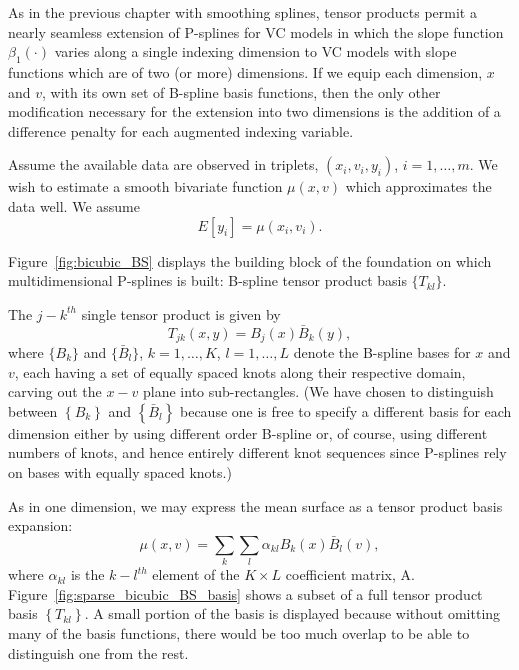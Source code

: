 \documentclass[12pt]{article}
\newcommand*\needsparaphrased{\color{red}}
\theoremstyle{definition}
\begin{document}
As in the previous chapter with smoothing splines, tensor products permit a nearly seamless extension of P-splines for VC models in which the slope function $\beta_1\left(\cdot\right)$ varies along a single indexing dimension to VC models with slope functions which are of two (or more) dimensions. If we equip each dimension, $x$ and $v$, with its own set of B-spline basis functions, then the only other modification necessary for the extension into two dimensions is the addition of a difference penalty for each augmented indexing variable.

Assume the available data are observed in triplets, $\left(x_i,v_i,y_i\right)$, $i=1,\dots,m$. We wish to estimate a smooth bivariate function $\mu\left(x,v\right)$ which approximates the data well. We assume
\begin{equation} \label{eq:2D_intercept_only_model}
E\left[ y_i \right] = \mu\left(x_i,v_i\right).
\end{equation}

Figure~\ref{fig:bicubic_BS} displays the building block of the foundation on which multidimensional P-splines is built: B-spline tensor product basis $\big\{ T_{kl}\big\}$.

The $j-k^{th}$ single tensor product is given by
\[
T_{jk}\left(x,y\right) = B_j\left(x\right)\bar{B}_k\left(y\right),
\]
where 
$\big\{ B_{k}\big\}$ and $\big\{ \bar{B}_{l}\big\}$, $k=1,\dots,K$, $l=1,\dots,L$ denote the B-spline bases for $x$ and $v$, each having a set of equally spaced knots along their respective domain, carving out the $x-v$ plane into sub-rectangles. (We have chosen to distinguish between $\left\{ B_k \right\}$ and $\left\{ \bar{B}_l \right\}$ because one is free to specify a different basis for each dimension either by using different order B-spline or, of course, using different numbers of knots, and hence entirely different knot sequences since P-splines rely on bases with equally spaced knots.)



As in one dimension, we may express the mean surface as a tensor product basis expansion:
\begin{equation} \label{eq:2D_intercept_only_model_TP_expansion}
\mu\left(x,v\right) = \sum_{k}\sum_l \alpha_{kl} B_k\left(x\right) \bar{B}_l\left(v\right),
\end{equation}
where $\alpha_{kl}$ is the $k-l^{th}$ element of the $K \times L$ coefficient matrix, A. Figure~\ref{fig:sparse_bicubic_BS_basis} shows a subset of a full tensor product basis $\left\{ T_{kl} \right\}$. A small portion of the basis is displayed because without omitting many of the basis functions, there would be too much overlap to be able to distinguish one from the rest. {\needsparaphrased{[ DISCUSS HOW THE PROPERTIES OF UNIVARIATE B-SPLINES TRANSLATE TO THE $x\times v$ PLANE (i.e. compact support, evaluation of the function at any point in the domain depends on only a small number of parameters, non-negative and sum to 1, etc.)]}}
\end{document}
